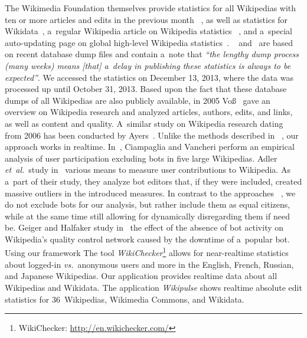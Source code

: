\documentclass{sig-alternate}
\newcommand{\inlinelistingsize}{\fontsize{8pt}{11pt}}
\let\oldurl\url
\renewcommand{\url}[1]{\inlinelistingsize\oldurl{#1}}
\begin{document}
The Wikimedia Foundation themselves provide
statistics for all Wikipedias
with ten or more articles and edits in the previous month%
~\cite{zachte2013wikipedia},
as well as statistics for Wikidata~\cite{zachte2013wikidata},
a~regular Wikipedia article on Wikipedia statistics%
~\cite{wikipedia2013stats},
and a~special auto-updating page on global high-level
Wikipedia statistics~\cite{wikipedia2013special}.
~\cite{zachte2013wikidata} and~\cite{zachte2013wikipedia}
are based on recent database dump files
and contain a~note that \textit{``the lengthy dump process
(many weeks) means [that] a~delay in publishing these statistics
is always to be expected''}.
We accessed the statistics on December 13, 2013,
where the data was processed up until October 31, 2013.
Based upon the fact that these database dumps
of all Wikipedias are also publicly available,
in 2005 Voß~\cite{voss2005measuring} gave 
an overview on Wikipedia research
and analyzed articles, authors, edits, and links,
as well as content and quality.
A~similar study on Wikipedia research dating from 2006
has been conducted by Ayers~\cite{ayers2006researchingwikipedia}.
Unlike the methods described in~%
\cite{ayers2006researchingwikipedia,voss2005measuring,zachte2013wikidata,zachte2013wikipedia},
our approach works in realtime.
In~\cite{ciampaglia2010empiricalanalysis}, Ciampaglia and Vancheri
perform an empirical analysis of user participation
excluding bots in five large Wikipedias.
Adler \emph{et~al.}\ study in~\cite{adler2008measuringauthor}
various means to measure user contributions to Wikipedia.
As a~part of their study, they analyze bot editors
that, if they were included, created massive outliers
in the introduced measures.
In contrast to the approaches%
~\cite{adler2008measuringauthor,ciampaglia2010empiricalanalysis},
we do not exclude bots for our analysis,
but rather include them as equal citizens,
while at the same time still allowing for dynamically
disregarding them if need be.
Geiger and Halfaker study in~\cite{geiger2013withoutbots}
the effect of the absence of bot activity on Wikipedia's
quality control network caused by the downtime of a~popular bot.
Using our framework
The tool \emph{WikiChecker}\footnote{WikiChecker:
\url{http://en.wikichecker.com/}}
allows for near-realtime statistics
about logged-in \emph{vs.}\ anonymous users and more in
the English, French, Russian, and Japanese Wikipedias.
Our application provides realtime data about all Wikipedias and Wikidata.
The application \emph{Wikipulse} shows realtime absolute
edit statistics for 36~Wikipedias, Wikimedia Commons, and Wikidata.
\end{document}
